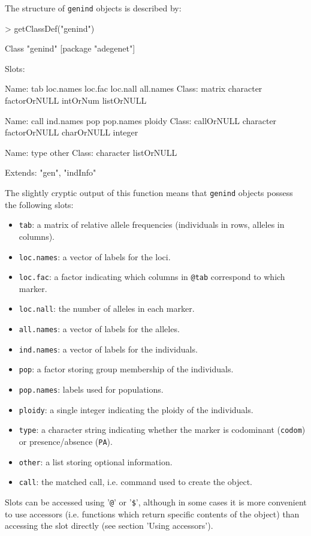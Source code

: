\documentclass{article}
\begin{document}
The structure of \texttt{genind} objects is described by:
\begin{Schunk}
\begin{Sinput}
> getClassDef("genind")
\end{Sinput}
\begin{Soutput}
Class "genind" [package "adegenet"]

Slots:
                                                                       
Name:           tab    loc.names      loc.fac     loc.nall    all.names
Class:       matrix    character factorOrNULL     intOrNum   listOrNULL
                                                                       
Name:          call    ind.names          pop    pop.names       ploidy
Class:   callOrNULL    character factorOrNULL   charOrNULL      integer
                                
Name:          type        other
Class:    character   listOrNULL

Extends: "gen", "indInfo"
\end{Soutput}
\end{Schunk}

The slightly cryptic output of this function means that \texttt{genind} objects possess the following slots:
\begin{itemize}
  \item \texttt{tab}: a matrix of relative allele frequencies (individuals in rows, alleles in columns).
  \item \texttt{loc.names}: a vector of labels for the loci.
  \item \texttt{loc.fac}: a factor indicating which columns in \texttt{@tab} correspond to which marker.
  \item \texttt{loc.nall}: the number of alleles in each marker.
  \item \texttt{all.names}: a vector of labels for the alleles.
  \item \texttt{ind.names}:  a vector of labels for the individuals.
  \item \texttt{pop}: a factor storing group membership of the individuals.
  \item \texttt{pop.names}: labels used for populations.
  \item \texttt{ploidy}: a single integer indicating the ploidy of the individuals.
  \item \texttt{type}: a character string indicating whether the marker is codominant
    (\texttt{codom}) or presence/absence (\texttt{PA}).
  \item \texttt{other}: a list storing optional information.
  \item \texttt{call}: the matched call, i.e. command used to create the object.
\end{itemize}
Slots can be accessed using '\texttt{@}' or '\texttt{\$}', although in some cases it is more
convenient to use accessors (i.e. functions which return specific contents of the object) than
accessing the slot directly (see section 'Using accessors').
\\
\end{document}
